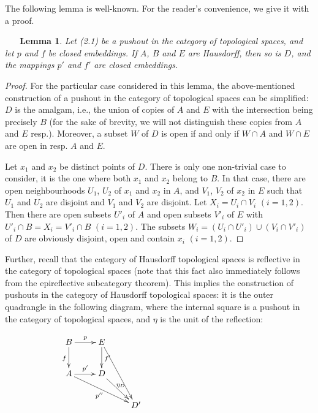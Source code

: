 \documentclass[12pt,reqno,intlim]{amsart}
\numberwithin{equation}{section}
\newtheorem{lem}[theo]{\ \ \ Lemma}
\theoremstyle{definition}
\theoremstyle{remark}
\begin{document}
The following lemma is well-known. For the reader's convenience, we give it with a proof.

\begin{lem}
Let (2.1) be a pushout in the category of topological spaces, and let $p$ and $f$ be closed embeddings. If $A$, $B$ and $E$ are Hausdorff, then so is $D$, and the mappings $p'$ and $f'$ are closed embeddings.
\end{lem}

\begin{proof}
For the particular case considered in  this lemma, the above-mentioned construction of a pushout in the category of topological spaces can be simplified: $D$ is the amalgam, i.e., the union of copies of $A$ and $E$ with the intersection being precisely $B$ (for the sake of brevity, we will not distinguish these copies from $A$ and $E$ resp.). Moreover, a subset $W$ of $D$ is open if and only if $W\cap A$ and $W\cap E$ are open in resp. $A$ and $E$.

Let $x_1$ and $x_2$ be distinct points of $D$. There is only one non-trivial case to consider, it is the one where both $x_1$ and $x_2$ belong to $B$. In that case, there are open neighbourhoods $U_1$, $U_2$ of $x_1$ and $x_2$ in $A$, and $V_1$, $V_2$ of $x_2$ in $E$ such that $U_1$ and $U_2$ are disjoint and $V_1$ and $V_2$ are disjoint. Let $X_i=U_i\cap V_i$  $(i=1,2)$. Then there are open subsets $U'_i$ of $A$ and open subsets $V'_i$ of $E$ with $U'_i\cap B=X_i=V'_i\cap B$  $(i=1,2)$. The subsets $W_i=(U_i\cap U'_i)\cup (V_i\cap V'_i)$ of $D$ are obviously disjoint, open and contain $x_i$  $(i=1,2)$.
\end{proof}

Further, recall that the category of Hausdorff topological spaces is reflective in the category of topological spaces \cite[Proposition 2, p.135]{M} (note that this fact also immediately follows from the epireflective subcategory theorem). This implies the construction of pushouts in the category of Hausdorff topological spaces: it is the outer quadrangle in the following diagram, where the internal square is a pushout in the category of topological spaces, and $\eta$ is the unit of the reflection:


\begin{equation}
\xymatrix{
B\ar[r]^{p}\ar[d]_{f}&E\ar[d]^{f'}\ar[ddr]\\
A\ar[r]^{p'}\ar[drr]_{p''}&D\ar[dr]^{\eta_D \; \; \; \; \; \; \; \; \; \; \; \; \;\; \; \; \; \; \; \; \; \; \; \; \; \;\; \; \; \; \; \; \; \; \; \; \; \; \; \; \;\; \; \; \; \; \; \; \; \; \; \; \; \;\; \; \; \; \; \; \; \; \; \; \; \; \; }\\
&&D'}
\end{equation}
\end{document}
